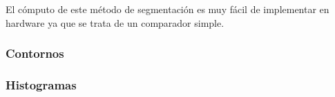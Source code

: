 \documentclass[twoside,spanish,ESP,MSc]{plantillaLabUPV}
\theoremstyle{definition}
\begin{document}
El cómputo de este método de segmentación es muy fácil de implementar en hardware ya que se trata de un comparador simple.

\subsubsection{Contornos}

\subsubsection{Histogramas}

%
%
%
%
%
%
\end{document}
